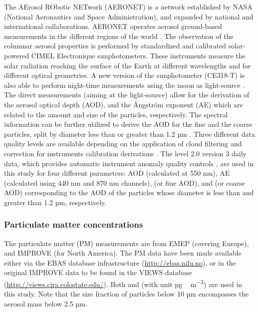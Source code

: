 \documentclass[acp, manuscript]{copernicus}
\begin{document}
The AErosol RObotic NETwork (AERONET) is a network established by NASA (National Aeronautics and Space Administration), and expanded by national and international collaborations. AERONET operates aerosol ground-based measurements in the different regions of the world \citep{holben2001emerging}. The observation of the columnar aerosol properties is performed by standardized and calibrated solar-powered CIMEL Electronique sunphotometers. These instruments measure the solar radiation reaching the surface of the Earth at different wavelengths and for different optical geometries. A new version of the sunphotometer (CE318-T) is also able to perform night-time measurements using the moon as light-source \citep{barreto2016new}. The direct measurements (aiming at the light-source) allow for the derivation of the aerosol optical depth (AOD), and the Ångström exponent (AE) which are related to the amount and size of the particles, respectively. The spectral information can be further utilized to derive the AOD for the fine and the coarse particles, split by diameter less than or greater than 1.2 \unit{µm} \citep{o2003spectral}. Three different data quality levels are available depending on the application of cloud filtering and correction for instruments calibration derivations \citep{smirnov2000cloud,smirnov2004aeronet}. The level 2.0 version 3 daily data, which provides automatic instrument anomaly quality controls \citep{giles2019advancements}, are used in this study for four different parameters:
AOD (calculated at 550 nm), AE (calculated using 440 nm and 870 nm channels),  (or fine AOD), and  (or coarse AOD) corresponding to the AOD of the particles whose diameter is less than and greater than 1.2 \unit{µm}, respectively.

\subsubsection{Particulate matter concentrations}
The particulate matter (PM) measurements are from EMEP (covering Europe), and IMPROVE (for North America). The PM data have been made available either via the EBAS database infrastructure  (\url{http://ebas.nilu.no}), or in the original IMPROVE data to be found in the VIEWS database (\url{http://views.cira.colostate.edu/}). Both  and  (with unit \unit{µg\,m^{-3}}) are used in this study. Note that the  size fraction of particles below 10 \unit{µm} encompasses the  aerosol mass below 2.5 \unit{µm}. 
\end{document}
